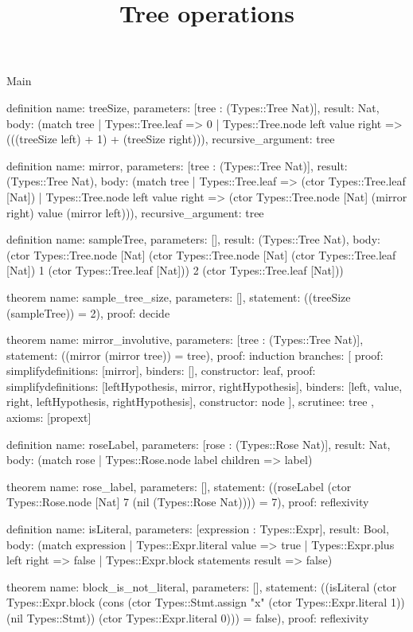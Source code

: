 \begin{lexlean}{Main}
\title{Tree operations}
\begin{semanticmodule}
definition{
  name: treeSize,
  parameters: [tree : (Types::Tree Nat)],
  result: Nat,
  body: (match tree
    | Types::Tree.leaf => 0
    | Types::Tree.node left value right => (((treeSize left) + 1) + (treeSize right))),
  recursive_argument: tree
}

definition{
  name: mirror,
  parameters: [tree : (Types::Tree Nat)],
  result: (Types::Tree Nat),
  body: (match tree
    | Types::Tree.leaf => (ctor Types::Tree.leaf [Nat])
    | Types::Tree.node left value right => (ctor Types::Tree.node [Nat] (mirror right) value (mirror left))),
  recursive_argument: tree
}

definition{
  name: sampleTree,
  parameters: [],
  result: (Types::Tree Nat),
  body: (ctor Types::Tree.node [Nat] (ctor Types::Tree.node [Nat] (ctor Types::Tree.leaf [Nat]) 1 (ctor Types::Tree.leaf [Nat])) 2 (ctor Types::Tree.leaf [Nat]))
}

theorem{
  name: sample_tree_size,
  parameters: [],
  statement: ((treeSize (sampleTree)) = 2),
  proof: decide{}
}

theorem{
  name: mirror_involutive,
  parameters: [tree : (Types::Tree Nat)],
  statement: ((mirror (mirror tree)) = tree),
  proof: induction{
    branches: [
      {proof: simplify{definitions: [mirror]}, binders: [], constructor: leaf},
      {
        proof: simplify{definitions: [leftHypothesis, mirror, rightHypothesis]},
        binders: [left, value, right, leftHypothesis, rightHypothesis],
        constructor: node
      }
    ],
    scrutinee: tree
  },
  axioms: [propext]
}

definition{
  name: roseLabel,
  parameters: [rose : (Types::Rose Nat)],
  result: Nat,
  body: (match rose | Types::Rose.node label children => label)
}

theorem{
  name: rose_label,
  parameters: [],
  statement: ((roseLabel (ctor Types::Rose.node [Nat] 7 (nil (Types::Rose Nat)))) = 7),
  proof: reflexivity{}
}

definition{
  name: isLiteral,
  parameters: [expression : Types::Expr],
  result: Bool,
  body: (match expression
    | Types::Expr.literal value => true
    | Types::Expr.plus left right => false
    | Types::Expr.block statements result => false)
}

theorem{
  name: block_is_not_literal,
  parameters: [],
  statement: ((isLiteral (ctor Types::Expr.block (cons (ctor Types::Stmt.assign "x" (ctor Types::Expr.literal 1)) (nil Types::Stmt)) (ctor Types::Expr.literal 0))) = false),
  proof: reflexivity{}
}


\end{semanticmodule}
\end{lexlean}
